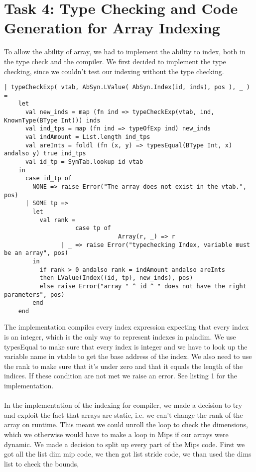 \section{Task 4: Type Checking and Code Generation for Array Indexing}

To allow the ability of array, we had to implement the ability to index, both in the type check and the compiler. We first decided to implement
the type checking, since we couldn't test our indexing without the type checking.

\begin{lstlisting}[style=MLStyle, caption=type checking for indexing]		
| typeCheckExp( vtab, AbSyn.LValue( AbSyn.Index(id, inds), pos ), _ ) =
    let 
      val new_inds = map (fn ind => typeCheckExp(vtab, ind, KnownType(BType Int))) inds
      val ind_tps = map (fn ind => typeOfExp ind) new_inds
      val indAmount = List.length ind_tps
      val areInts = foldl (fn (x, y) => typesEqual(BType Int, x) andalso y) true ind_tps
      val id_tp = SymTab.lookup id vtab
    in
      case id_tp of 
        NONE => raise Error("The array does not exist in the vtab.", pos)
      | SOME tp => 
        let
          val rank = 
					case tp of
								Array(r, _) => r
                | _ => raise Error("typechecking Index, variable must be an array", pos)
        in
          if rank > 0 andalso rank = indAmount andalso areInts 
          then LValue(Index((id, tp), new_inds), pos)
          else raise Error("array " ^ id ^ " does not have the right parameters", pos)
        end
    end	
\end{lstlisting}
The implementation compiles every index expression expecting that every index is an integer, which is the only way to represent indexes in 
paladim. We use typesEqual to make sure that every index is integer and we have to look up the variable name in vtable to get the base address of the index. 
We also need to use the rank to make sure that it's under zero and that it equals the length of the indices. If these condition are not met we raise an error. 
See listing 1 for the implementation.
\\
\\
In the implementation of the indexing for compiler, we made a decision to try
and exploit the fact that arrays are static, i.e. we can't change
the rank of the array on runtime. This meant we could unroll the loop to check the dimensions, which we otherwise would have to make a loop in
Mips if our arrays were dynamic. We made a decision to split up every part of the Mips code.
First we got all the list dim mip code, we then got list stride code, we than used the dims list to check the bounds, 

